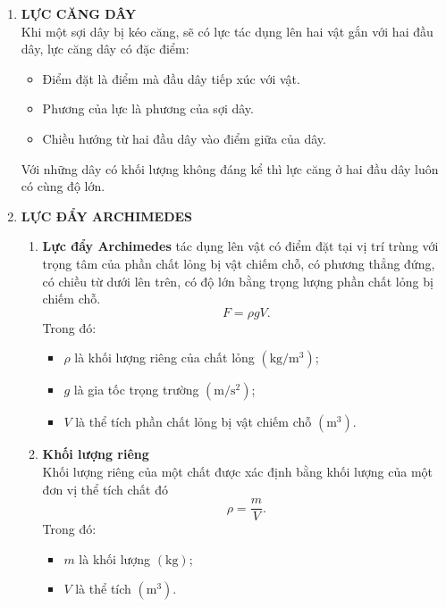 \begin{enumerate}[label=\bfseries\Roman*.]
\begin{enumerate}[label=\bfseries\arabic*.]
	\end{enumerate}
	\item \textbf{LỰC CĂNG DÂY}\\
	Khi một sợi dây bị kéo căng, sẽ có lực tác dụng lên hai vật gắn với hai đầu dây, lực căng dây có đặc điểm:
	\begin{itemize}
		\item Điểm đặt là điểm mà đầu dây tiếp xúc với vật.
		\item Phương của lực là phương của sợi dây.
		\item Chiều hướng từ hai đầu dây vào điểm giữa của dây.
	\end{itemize}
	Với những dây có khối lượng không đáng kể thì lực căng ở hai đầu dây luôn có cùng độ lớn.
	\item \textbf{LỰC ĐẨY ARCHIMEDES}\\
	\begin{enumerate}[label=\bfseries \arabic*.]
		\item \textbf{Lực đẩy Archimedes} tác dụng lên vật có điểm đặt tại vị trí trùng với trọng tâm của phần chất lỏng bị vật chiếm chỗ, có phương thẳng đứng, có chiều từ dưới lên trên, có độ lớn bằng trọng lượng phần chất lỏng bị chiếm chỗ.
		$$F=\rho gV.$$
		Trong đó:
		\begin{itemize}
			\item $\rho$ là khối lượng riêng của chất lỏng $\left(\si{\kilogram/\meter^3}\right)$;
			\item $g$ là gia tốc trọng trường $\left(\si{\meter/\second^2}\right)$;
			\item $V$ là thể tích phần chất lỏng bị vật chiếm chỗ $\left(\si{\meter^3}\right)$.
		\end{itemize}
		\item \textbf{Khối lượng riêng}\\
		Khối lượng riêng của một chất được xác định bằng khối lượng của một đơn vị thể tích chất đó
		$$\rho=\dfrac{m}{V}.$$
		Trong đó:
		\begin{itemize}
			\item $m$ là khối lượng $\left(\si{\kilogram}\right)$;
			\item $V$ là thể tích $\left(\si{\meter^3}\right)$.
		\end{itemize}
	\end{enumerate}
\end{enumerate}
